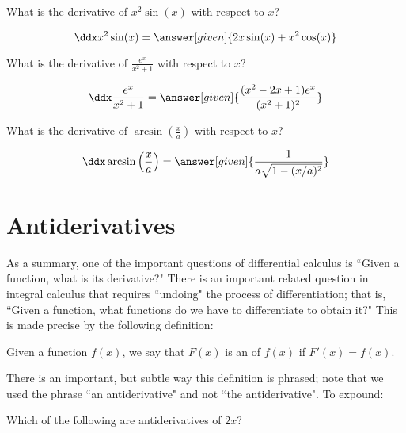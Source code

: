 \documentclass[nooutcomes]{ximera}
\begin{document}
 
\begin{question} 
  What is the derivative of $x^2 \sin(x) $ with respect to $x$?
  \begin{prompt} 
    \[
    \ddx x^2 \sin(x) = \answer[given]{2x \sin(x) +x^2 \cos(x)}
    \]
  \end{prompt}
\end{question}

\begin{question} 
  What is the derivative of $\frac{e^x}{x^2+1}$ with respect to $x$?
  \begin{prompt} 
    \[
    \ddx \frac{e^x}{x^2+1} = \answer[given]{\frac{( x^2 - 2x +1)e^x}{(x^2+1)^2}}
    \]
  \end{prompt}
\end{question}\begin{question} 
  What is the derivative of $\arcsin\left(\frac{x}{a}\right)$ with respect to $x$?
  \begin{prompt} 
    \[
    \ddx \arcsin\left(\frac{x}{a}\right) = \answer[given]{\frac{1}{a \sqrt{1-(x/a)^2}}}
    \]
  \end{prompt}
\end{question}





\section{Antiderivatives}


As a summary, one of the important questions of differential calculus is ``Given a function, what is its derivative?"  There is an important related question in integral calculus that requires ``undoing" the process of differentiation; that is, ``Given a function, what functions do we have to differentiate to obtain it?"   This is made precise by the following definition:

\begin{definition}  
Given a function $f(x)$, we say that $F(x)$ is an  of $f(x)$ if $F'(x) = f(x)$.
\end{definition}

 There is an important, but subtle way this definition is phrased; note that we used the phrase ``an antiderivative" and not ``the antiderivative".  To expound:
 
 \begin{question}
  Which of the following are antiderivatives of $2x$?
  \begin{selectAll}
  \end{selectAll}
\end{question}
\end{document}
